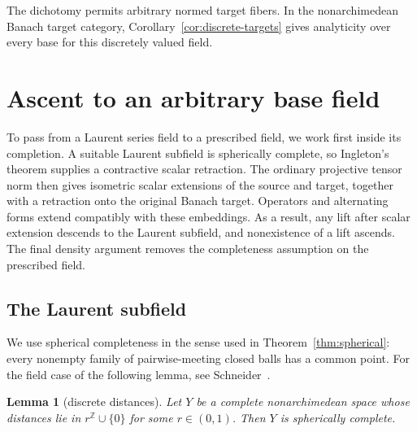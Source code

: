 \documentclass[11pt]{amsart}
\newtheorem{lemma}[theorem]{Lemma}
\theoremstyle{definition}
\theoremstyle{remark}
\numberwithin{equation}{section}
\newcommand{\Z}{\mathbb Z}
\begin{document}
The dichotomy permits arbitrary normed target fibers. In the nonarchimedean Banach target category, Corollary~\ref{cor:discrete-targets} gives analyticity over every base for this discretely valued field.


\section{Ascent to an arbitrary base field}\label{app:ascent}\label{sec:ascent}

To pass from a Laurent series field to a prescribed field, we work first inside its completion. A suitable Laurent
subfield is spherically complete, so Ingleton's theorem supplies a contractive scalar retraction. The ordinary
projective tensor norm then gives isometric scalar extensions of the source and target, together with a retraction
onto the original Banach target. Operators and alternating forms extend compatibly with these embeddings. As a
result, any lift after scalar extension descends to the Laurent subfield, and nonexistence of a lift ascends.
The final density argument removes the completeness assumption on the prescribed field.

\subsection{The Laurent subfield}
We use spherical completeness in the sense used in Theorem~\ref{thm:spherical}: every nonempty family of pairwise-meeting
closed balls has a common point. For the field case of the following lemma, see
Schneider~\cite[Lemmas~1.3 and~1.6]{Sch}.

\begin{lemma}[discrete distances]\label{lem:discdist}
Let $Y$ be a complete nonarchimedean space whose distances lie in $r^\Z\cup\{0\}$ for some $r\in(0,1)$. Then $Y$ is
spherically complete.
\end{lemma}
\end{document}
